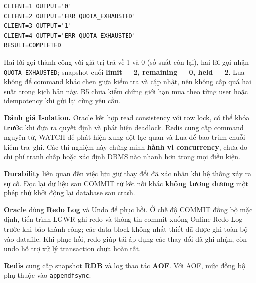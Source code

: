 \begingroup
{}\label{result:tx-15}
\nopagebreak[4]
\begin{Verbatim}
CLIENT=1 OUTPUT='0'
CLIENT=2 OUTPUT='ERR QUOTA_EXHAUSTED'
CLIENT=3 OUTPUT='1'
CLIENT=4 OUTPUT='ERR QUOTA_EXHAUSTED'
RESULT=COMPLETED
\end{Verbatim}
\endgroup\par\smallskip
Hai lời gọi thành công với giá trị trả về 1 và 0 (số suất còn lại), hai lời gọi nhận \texttt{QUOTA\_\allowbreak{}EXHAUSTED}; snapshot cuối \textbf{limit = 2, remaining = 0, held = 2}. Lua không để command khác chen giữa kiểm tra và cập nhật, nên không cấp quá hai suất trong kịch bản này. B5 chưa kiểm chứng giới hạn mua theo từng user hoặc idempotency khi gửi lại cùng yêu cầu.

\textbf{Đánh giá Isolation.} Oracle kết hợp read consistency với row lock, có thể khóa \textbf{trước} khi đưa ra quyết định và phát hiện deadlock. Redis cung cấp command nguyên tử, WATCH để phát hiện xung đột lạc quan và Lua để bao trùm chuỗi kiểm tra–ghi. Các thí nghiệm này chứng minh \textbf{hành vi concurrency}, chưa đo chi phí tranh chấp hoặc xác định DBMS nào nhanh hơn trong mọi điều kiện.

\label{sec:tx-2-4}
\textbf{Durability} liên quan đến việc lưu giữ thay đổi đã xác nhận khi hệ thống xảy ra sự cố. Đọc lại dữ liệu sau COMMIT từ kết nối khác \textbf{không tương đương} một phép thử khởi động lại database sau crash.

\textbf{Oracle} dùng \textbf{Redo Log} và Undo để phục hồi. Ở chế độ COMMIT đồng bộ mặc định, tiến trình LGWR ghi redo và thông tin commit xuống Online Redo Log trước khi báo thành công; các data block không nhất thiết đã được ghi toàn bộ vào datafile. Khi phục hồi, redo giúp tái áp dụng các thay đổi đã ghi nhận, còn undo hỗ trợ xử lý transaction chưa hoàn tất.

\textbf{Redis} cung cấp snapshot \textbf{RDB} và log thao tác \textbf{AOF}. Với AOF, mức đồng bộ phụ thuộc vào \texttt{appendfsync}:

